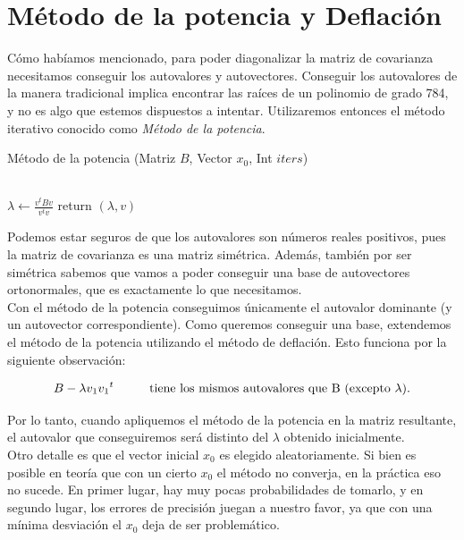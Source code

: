 \section{Método de la potencia y Deflación}

Cómo habíamos mencionado, para poder diagonalizar la matriz de covarianza necesitamos conseguir los autovalores y autovectores. Conseguir los autovalores de la manera tradicional implica encontrar las raíces de un polinomio de grado 784, y no es algo que estemos dispuestos a intentar. Utilizaremos entonces el método iterativo conocido como \textit{Método de la potencia}.
\begin{algorithm}
    \caption{Método de la potencia (Matriz $B$, Vector $x_0$, Int $iters$)}
    \begin{algorithmic}[h]
             \\
        \EndFor
        \State  $\lambda \gets \frac{v^tBv}{v^tv}$
        \State return $(\lambda, v)$

    \end{algorithmic}
\end{algorithm}

Podemos estar seguros de que los autovalores son números reales positivos, pues la matriz de covarianza es una matriz simétrica. Además, también por ser simétrica sabemos que vamos a poder conseguir una base de autovectores ortonormales, que es exactamente lo que necesitamos. \\

Con el método de la potencia conseguimos únicamente el autovalor dominante (y un autovector correspondiente). Como queremos conseguir una base, extendemos el método de la potencia utilizando el método de deflación. Esto funciona por la siguiente observación:

$$ B - \lambda v_1 {v_1}^{t} \text{\hspace{1cm}tiene los mismos autovalores que B (excepto $\lambda$).} $$

Por lo tanto, cuando apliquemos el método de la potencia en la matriz resultante, el autovalor que conseguiremos será distinto del $\lambda$ obtenido inicialmente. \\

Otro detalle es que el vector inicial $x_0$ es elegido aleatoriamente. Si bien es posible en teoría que con un cierto $x_0$ el método no converja, en la práctica eso no sucede. En primer lugar, hay muy pocas probabilidades de tomarlo, y en segundo lugar, los errores de precisión juegan a nuestro favor, ya que con una mínima desviación el $x_0$ deja de ser problemático. \\

